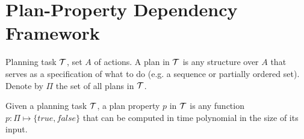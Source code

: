\section{Plan-Property Dependency Framework}


Planning task $\cal T$, set $A$ of actions. A plan in $\cal T$ is any structure over $A$ that serves as a specification of what to do (e.g. a sequence or partially ordered set). Denote by $\Pi$ the set of all plans in $\cal T$.

\begin{definition}
Given a planning task $\cal T$, a plan property $p$ in $\cal T$ is any function $p : \Pi \mapsto \{true, false\}$ that can be computed in time polynomial in the size of its input.
\end{definition}


